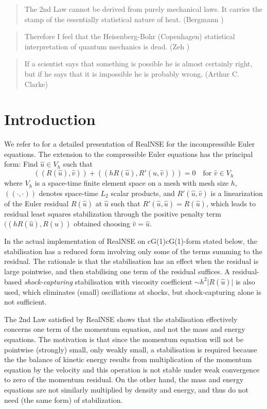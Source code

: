 \begin{quote} The 2nd Law cannot be derived from purely mechanical
laws. It carries the stamp of the essentially statistical nature of heat.
(Bergmann \cite{bergmann})
\end{quote}
\begin{quote}
Therefore I feel that the Heisenberg-Bohr (Copenhagen)
statistical interpretation of quantum mechanics is dead. 
(Zeh \cite{zeh})
\end{quote}
\begin{quote}
If a scientist says that something
is possible he is almost certainly right, but if he says that it is
impossible he is probably wrong. (Arthur C. Clarke)
\end{quote}
\normalsize


\section{Introduction}
We refer to \cite{ambsflow} for a detailed presentation of 
RealNSE for the incompressible Euler equations. The extension 
to the compressible Euler equations has the principal form:
Find $\hat u\in V_h$ such that 
\begin{equation}\label{RealNSEgen}
((R(\hat u),\hat v))+((hR(\hat u),R'(\hat u,\hat v)))=0\quad \mbox{for }\hat v\in V_h
\end{equation}
where $V_h$ is a space-time finite element space on
a mesh with mesh size $h$, $((\cdot ,\cdot ))$ denotes
space-time $L_2$ scalar products, and $R'(\hat u,\hat v)$ 
is a linearization of the Euler residual $R(\hat u)$ at $\hat u$ 
such that $R'(\hat u,\hat u)=R(\hat u)$, which leads to residual
least squares stabilization 
through the positive penalty term $((hR(\hat u),R(\hat u))$
obtained choosing $\hat v=\hat u$.

In the actual implementation of RealNSE on cG(1)cG(1)-form stated below,
the stabilisation
has a reduced form involving only some of the terms summing
to the residual. The rationale is that the stabilisation 
has an effect
when the residual is large pointwise, and then stabilising 
one term of the residual suffices. A residual-based 
\emph{shock-capturing} stabilisation with viscosity coefficient
$\sim h^2\vert R(\hat u)\vert$  is also used, which eliminates (small)
oscillations at shocks, but shock-capturing alone is not sufficient.

The 2nd Law satisfied by RealNSE 
shows that the stabilisation effectively concerns one term
of the momentum equation,
and not the mass and energy equations. The motivation is
that since the momentum equation will not be pointwise (strongly)
small, only weakly small, a stabilisation is required because the 
the balance of kinetic energy results from multiplication 
of the momentum equation by the velocity and this
operation is not stable under weak convergence to zero of the momentum residual.
On the other hand, the mass and energy equations are not similarly
multiplied by density and energy, and thus do not need 
(the same form) of stabilization. 
 

